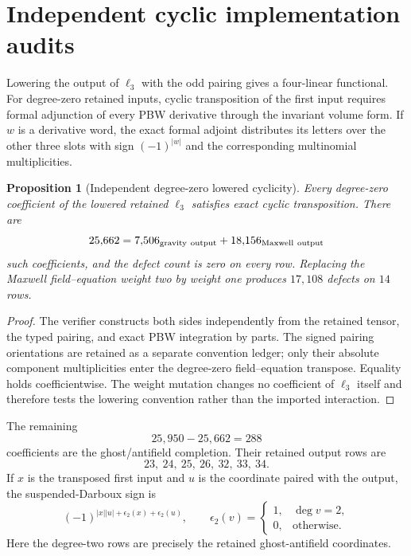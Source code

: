 \documentclass[11pt]{article}
\newtheorem{proposition}[theorem]{Proposition}
\theoremstyle{definition}
\theoremstyle{remark}
\begin{document}
\section{Independent cyclic implementation audits}\label{sec:cyclicity}

Lowering the output of $\ell_3$ with the odd pairing gives a four-linear
functional.  For degree-zero retained inputs, cyclic transposition of the
first input requires formal adjunction of every PBW derivative through the
invariant volume form.  If $w$ is a derivative word, the exact formal adjoint
distributes its letters over the other three slots with sign $(-1)^{|w|}$ and
the corresponding multinomial multiplicities.

\begin{proposition}[Independent degree-zero lowered cyclicity]
\label{prop:cyclicity}
Every degree-zero coefficient of the lowered retained
$\ell_3$ satisfies exact cyclic transposition.  There are
\begin{equation}
 25{,}662=7{,}506_{\rm gravity\ output}
             +18{,}156_{\rm Maxwell\ output}
\end{equation}
such coefficients, and the defect count is zero on every row.  Replacing the
Maxwell field--equation weight two by weight one produces $17{,}108$ defects
on $14$ rows.
\end{proposition}

\begin{proof}
The verifier constructs both sides independently from the retained tensor,
the typed pairing, and exact PBW integration by parts.  The signed pairing
orientations are retained as a separate convention ledger; only their
absolute component multiplicities enter the degree-zero field--equation
transpose.  Equality holds coefficientwise.  The weight mutation changes no
coefficient of $\ell_3$ itself and therefore tests the lowering convention
rather than the imported interaction.
\end{proof}

The remaining
\begin{equation}
 25{,}950-25{,}662=288
\end{equation}
coefficients are the ghost/antifield completion.  Their retained output rows
are
\[
 23,\ 24,\ 25,\ 26,\ 32,\ 33,\ 34.
\]
If $x$ is the transposed first input and $u$ is
the coordinate paired with the output, the suspended-Darboux sign is
\begin{equation}
 (-1)^{|x||u|+\epsilon_2(x)+\epsilon_2(u)},
 \qquad
 \epsilon_2(v)=\begin{cases}1,&\deg v=2,\\0,&\text{otherwise.}\end{cases}
\end{equation}
Here the degree-two rows are precisely the retained ghost-antifield
coordinates.
\end{document}

